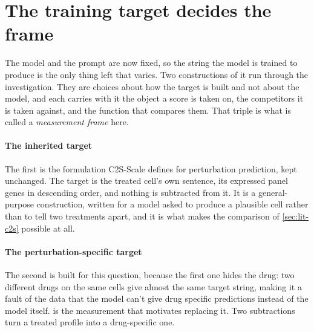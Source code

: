 \section{The training target decides the frame}
\label{sec:apparatus-vocab}

The model and the prompt are now fixed, so the string the model is trained to
produce is the only thing left that varies. Two constructions of it run through
the investigation. They are choices about how the target is built and not about
the model, and each carries with it the object a score is taken on, the
competitors it is taken against, and the function that compares them. That triple
is what is called a \emph{measurement frame} here.

\paragraph{The inherited target} The first is the formulation C2S-Scale defines
for perturbation prediction, kept unchanged. The target is the treated cell's
own sentence, its expressed panel genes in descending order, and nothing is
subtracted from it. It is a general-purpose construction, written for a model
asked to produce a plausible cell rather than to tell two treatments apart, and
it is what makes the comparison of \cref{sec:lit-c2s} possible at all.

\paragraph{The perturbation-specific target} The second is built for this
question, because the first one hides the drug: two different drugs on the same cells give
almost the same target string, making it a fault of the data that the model can't give drug specific predictions instead of the model itself.   is the measurement
that motivates replacing it. Two subtractions turn a treated profile into a
drug-specific one.

